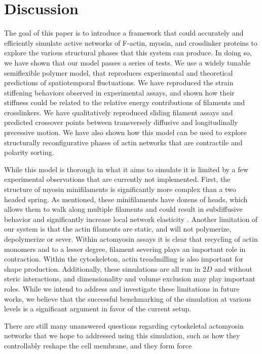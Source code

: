 \documentclass[12pt]{article}
\begin{document}
\section{Discussion}
The goal of this paper is to introduce a framework that could accurately and efficiently simulate active networks of F-actin,
myosin, and crosslinker proteins to explore the various structural phases that this system can produce. In doing so, we
have shown that our model passes a series of tests. We use a widely tunable semiflexible polymer model, that
reproduces experimental and theoretical predictions of spatiotemporal fluctuations. We have reproduced the strain stiffening
behaviors observed in experimental assays, and shown how their stiffness could be related to the relative energy
contributions of filaments and crosslinkers. We have qualitatively reproduced sliding filament assays and predicted
crossover points between transversely diffusive and longitudinally precessive motion. 
We have also shown how this model can be used to explore
structurally reconfigurative phases of actin networks that are contractile and polarity sorting.  
\par
While this model is thorough in what it aims to simulate it is limited by a few experimental observations that are
currently not implemented. First, the structure of myosin minifilaments is significantly more complex than a two headed
spring. As mentioned, these minifilaments have dozens of heads, which allows them to walk along multiple filaments and
could result in subdiffusive behavior \cite{scholz2016} and significantly increase local network elasticity
\cite{murrellTalk}.
Another limitation of our system is that the actin filaments are static, and will not polymerize, depolymerize or
sever. Within actomyosin assays it is clear that recycling of actin monomers and to a lesser degree, filament severing 
plays an important role in contraction\cite{murrell2012}. Within the cytoskeleton, actin treadmilling is also important
for shape production. Additionally, these simulations are all run in $2D$ and without steric interactions, and
dimensionality and volume exclusion may play important roles. While we intend to address and investigate these limitations in future
works, we believe that the successful benchmarking of the simulation at various levels is a significant argument in favor of the
current setup.
\par 
There are still many unanswered questions regarding cytoskeletal actomyosin networks that we hope to 
addressed using this simulation, such as how they controllably reshape the cell membrane, and they form force
\end{document}
